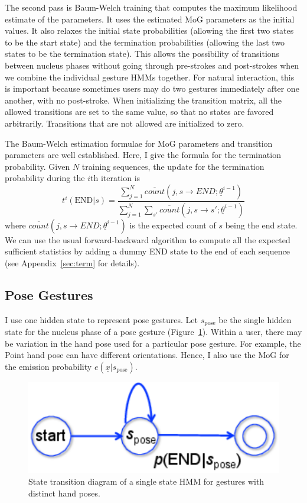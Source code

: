 The second pass is Baum-Welch training that computes the maximum likelihood
estimate of the parameters.
It uses the estimated MoG parameters as the initial values. It also relaxes the
initial state probabilities (allowing the first two states to be the start
state) and the termination probabilities (allowing the last two states to be the
termination state). This allows the possibility of transitions between nucleus
phases without going through pre-strokes and post-strokes when we combine the
individual gesture HMMs together. For natural interaction, this is important
because sometimes users may do two gestures immediately after one another, with
no post-stroke. When initializing the transition matrix, all the allowed
transitions are set to the same value, so that no states are favored arbitrarily. Transitions that are not allowed are initialized to zero.

The Baum-Welch estimation formulae for MoG parameters and transition parameters
are well established. Here, I give the formula for the termination probability.
Given $N$ training sequences, the update for the termination probability during the $i$th iteration is 
\begin{displaymath}
t^i(\text{END}|s) = \frac{\sum_{j = 1}^N \overline{count}(j, s\rightarrow
END;\underline{\theta}^{i-1})} {\sum_{j = 1}^N\sum_{s'} \overline{count}(j, s\rightarrow s';\underline{\theta}^{i-1})}
\end{displaymath}
where $\overline{count}(j, s\rightarrow END;\underline{\theta}^{i-1})$ is the expected count of 
$s$ being the end state. We can use the usual forward-backward algorithm to compute all the 
expected sufficient statistics by adding a dummy END state to the end of each
sequence (see Appendix~\ref{sec:term} for details).

\subsection{Pose Gestures}
I use one hidden state to represent pose gestures. Let
$s_{\text{pose}}$ be the single hidden state for the nucleus phase of a
pose gesture (Figure~\ref{fig:single}). Within a user,
there may be variation in the hand pose used for a particular pose gesture.
For example, the Point hand pose can have different orientations.
Hence, I also use the MoG for the emission probability
$e(\underline{x} | s_\text{pose})$. 

\begin{figure}[tbh]
\centering
\includegraphics[width=0.5\columnwidth]{figures/single_state.pdf}
\caption{State transition diagram of a single state HMM for gestures with
distinct hand poses. }
\label{fig:single}
\end{figure}

